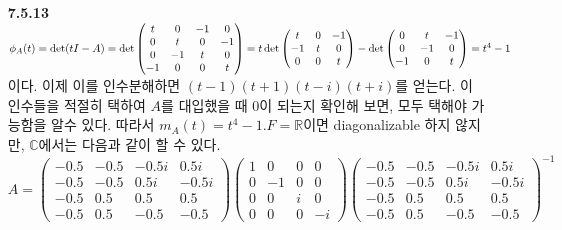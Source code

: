 \documentclass{article}
\begin{document}
\begin{itemize}
\item[\textbf{7.5.13}] $\phi_A(t) = \det(tI-A) = \det \begin{pmatrix}t&0&-1&0\\0&t&0&-1\\0&-1&t&0\\-1&0&0&t \end{pmatrix} = t\det{\begin{pmatrix}t&0&-1\\-1&t&0\\0&0&t\end{pmatrix}} - \det{\begin{pmatrix}0&t&-1\\0&-1&0\\-1&0&t\end{pmatrix}}\\ = t^4 - 1$ 이다. 이제 이를 인수분해하면 $(t-1)(t+1)(t-i)(t+i)$를 얻는다. 이 인수들을 적절히 택하여 $A$를 대입했을 때 $0$이 되는지 확인해 보면, 모두 택해야 가능함을 알수 있다. 따라서 $m_A(t) = t^4-1$.$F=\mathbb{R}$이면 diagonalizable 하지 않지만, $\mathbb{C}$에서는 다음과 같이 할 수 있다.
$$A= \begin{pmatrix}-0.5&-0.5&-0.5i&0.5i\\-0.5&-0.5&0.5i&-0.5i\\-0.5&0.5&0.5&0.5\\-0.5&0.5&-0.5&-0.5\end{pmatrix}\begin{pmatrix}1&0&0&0\\0&-1&0&0\\0&0&i&0\\0&0&0&-i\end{pmatrix}\begin{pmatrix}-0.5&-0.5&-0.5i&0.5i\\-0.5&-0.5&0.5i&-0.5i\\-0.5&0.5&0.5&0.5\\-0.5&0.5&-0.5&-0.5\end{pmatrix}^{-1}$$


\end{itemize}
\end{document}
